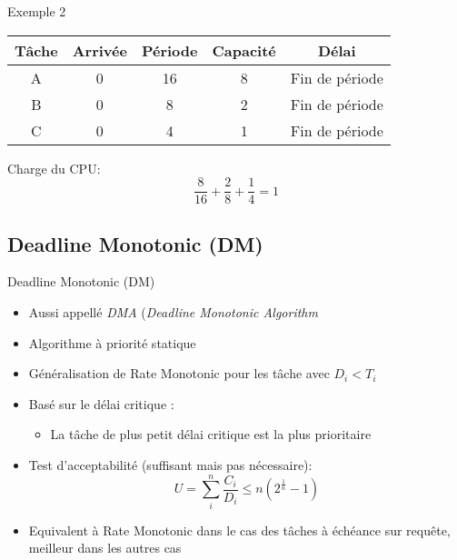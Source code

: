 \begin{frame}{Exemple 2}
  \begin{center}
    \begin{tabular}{ccccc}
      \hline
      Tâche & Arrivée & Période & Capacité & Délai \\
      \hline
      A & 0 & 16 & 8 & Fin de période\\
      B & 0 &  8 & 2 & Fin de période\\
      C & 0 &  4 & 1 & Fin de période\\
      \hline
    \end{tabular}
  \end{center}
  
  \pause
  Charge du CPU:
  $$\frac{8}{16} + \frac{2}{8} + \frac{1}{4} = 1$$
  
  \pause
  \begin{center}
    
  \end{center}
\end{frame}

\subsection{Deadline Monotonic (DM)}

\begin{frame}{Deadline Monotonic (DM)} 
  \begin{itemize}
  \item Aussi appellé \emph{DMA} (\emph{Deadline Monotonic Algorithm}
  \item Algorithme à priorité statique
  \item Généralisation de Rate Monotonic pour les tâche avec $D_i < T_i$
  \item Basé sur le délai critique :
    \begin{itemize}
    \item La tâche de plus petit délai critique est la plus prioritaire
    \end{itemize}
  \item Test d'acceptabilité (suffisant mais pas nécessaire):
    $$U = \sum_i^n \frac{C_i}{D_i} ≤ n \left(2^{\frac{1}{n}}-1\right)$$
  \item Equivalent à Rate Monotonic  dans le cas des tâches à échéance
    sur requête, meilleur dans les autres cas
  \end{itemize}
\end{frame}

